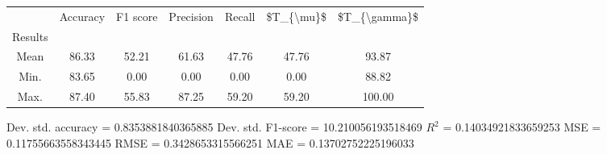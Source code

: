 \begin{tabular}{|c|c|c|c|c|c|c|}
\toprule
{} &  Accuracy &  F1 score &  Precision &  Recall &  \$T\_\{\textbackslash mu\}\$ &  \$T\_\{\textbackslash gamma\}\$ \\
Results &           &           &            &         &            &               \\
\hline
Mean    &     86.33 &     52.21 &      61.63 &   47.76 &      47.76 &         93.87 \\
Min.    &     83.65 &      0.00 &       0.00 &    0.00 &       0.00 &         88.82 \\
Max.    &     87.40 &     55.83 &      87.25 &   59.20 &      59.20 &        100.00 \\
\bottomrule
\end{tabular}

 Dev. std. accuracy = 0.8353881840365885
 Dev. std. F1-score = 10.210056193518469
 $R^2$ = 0.14034921833659253
 MSE = 0.11755663558343445
 RMSE = 0.3428653315566251
 MAE = 0.13702752225196033